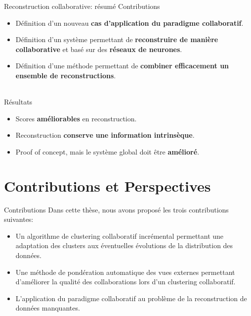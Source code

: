 \documentclass[hyperref={pdfpagelabels=false}]{beamer}
\begin{document}
    \begin{frame}{Reconstruction collaborative: résumé}
        Contributions
        \begin{itemize}
            \item Définition d'un nouveau \textbf{cas d'application du paradigme
                collaboratif}.
            \item Définition d'un système permettant de \textbf{reconstruire de manière
                collaborative} et basé sur des \textbf{réseaux de neurones}.
            \item Définition d'une méthode permettant de \textbf{combiner efficacement
                un ensemble de reconstructions}.\\~\\
        \end{itemize}
        Résultats
        \begin{itemize}
            \item Scores \textbf{améliorables} en reconstruction.
            \item Reconstruction \textbf{conserve une information intrinsèque}.
            \item Proof of concept, mais le système global doit être 
                \textbf{amélioré}.

        \end{itemize}
    \end{frame}

    \section{Contributions et Perspectives}
    \begin{frame}{Contributions}
        Dans cette thèse, nous avons proposé les trois contributions suivantes:
        \begin{itemize}
            \item Un algorithme de clustering collaboratif incrémental 
                permettant une adaptation des clusters aux éventuelles 
                évolutions de la distribution des données.
            \item Une méthode de pondération automatique des vues externes 
                permettant d'améliorer la qualité des collaborations lors d'un 
                clustering collaboratif.
            \item L'application du paradigme collaboratif au problème de la 
                reconstruction de données manquantes.
        \end{itemize}
    \end{frame}
\end{document}
